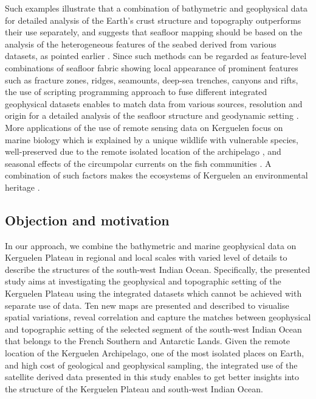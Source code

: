 \documentclass[geomatics,article,submit,pdftex,moreauthors]{Definitions/mdpi}
\begin{document}
Such examples illustrate that a combination of bathymetric and geophysical data for detailed analysis of the Earth's crust structure and topography outperforms their use separately, and suggests that seafloor mapping should be based on the analysis of the heterogeneous features of the seabed derived from various datasets, as pointed earlier \cite{COWLEY2004267,Lemenkova202125,1993A234,ABUAMARAH2019868}. Since such methods can be regarded as feature-level combinations of seafloor fabric showing local appearance of prominent features such as fracture zones, ridges, seamounts, deep-sea trenches, canyons and rifts, the use of scripting programming approach to fuse different integrated geophysical datasets enables to match data from various sources, resolution and origin for a detailed analysis of the seafloor structure and geodynamic setting \cite{Veevers1991b,Lemenkova202104,Hill}. More applications of the use of remote sensing data on Kerguelen focus on marine biology which is explained by a unique wildlife with vulnerable species, well-preserved due to the remote isolated location of the archipelago \cite{fishes8040174}, and seasonal effects of the circumpolar currents on the fish communities \cite{Damerell,MONGIN2008880,Park}. A combination of such factors makes the ecosystems of Kerguelen an environmental heritage \cite{Sombetzkib,Sombetzkia,Naim}. 

\subsection{Objection and motivation}

In our approach, we combine the bathymetric and marine geophysical data on Kerguelen Plateau in regional and local scales with varied level of details to describe the structures of the south-west Indian Ocean. Specifically, the presented study aims at investigating the geophysical and topographic setting of the Kerguelen Plateau using the integrated datasets which cannot be achieved with separate use of data. Ten new maps are presented and described to visualise spatial variations, reveal correlation and capture the matches between geophysical and topographic setting of the selected segment of the south-west Indian Ocean that belongs to the French Southern and Antarctic Lands. Given the remote location of the Kerguelen Archipelago, one of the most isolated places on Earth, and high cost of geological and geophysical sampling, the integrated use of the satellite derived data presented in this study enables to get better insights into the structure of the Kerguelen Plateau and south-west Indian Ocean.
\end{document}

